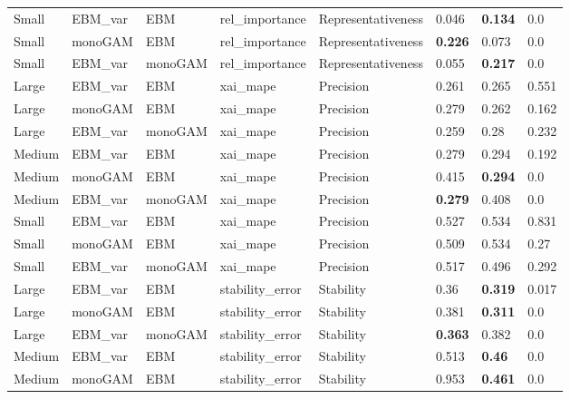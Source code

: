 \begin{table}[]
{\begin{tabular}{@{}llllllll@{}}
Small  & EBM\_var & EBM     & rel\_importance   & Representativeness & 0.046          & \textbf{0.134} & 0.0   \\
Small  & monoGAM        & EBM     & rel\_importance   & Representativeness & \textbf{0.226} & 0.073          & 0.0   \\
Small  & EBM\_var & monoGAM & rel\_importance   & Representativeness & 0.055          & \textbf{0.217} & 0.0   \\
Large  & EBM\_var & EBM     & xai\_mape         & Precision          & 0.261          & 0.265          & 0.551 \\
Large  & monoGAM        & EBM     & xai\_mape         & Precision          & 0.279          & 0.262          & 0.162 \\
Large  & EBM\_var & monoGAM & xai\_mape         & Precision          & 0.259          & 0.28           & 0.232 \\
Medium & EBM\_var & EBM     & xai\_mape         & Precision          & 0.279          & 0.294          & 0.192 \\
Medium & monoGAM        & EBM     & xai\_mape         & Precision          & 0.415          & \textbf{0.294} & 0.0   \\
Medium & EBM\_var & monoGAM & xai\_mape         & Precision          & \textbf{0.279} & 0.408          & 0.0   \\
Small  & EBM\_var & EBM     & xai\_mape         & Precision          & 0.527          & 0.534          & 0.831 \\
Small  & monoGAM        & EBM     & xai\_mape         & Precision          & 0.509          & 0.534          & 0.27  \\
Small  & EBM\_var & monoGAM & xai\_mape         & Precision          & 0.517          & 0.496          & 0.292 \\
Large  & EBM\_var & EBM     & stability\_error  & Stability          & 0.36           & \textbf{0.319} & 0.017 \\
Large  & monoGAM        & EBM     & stability\_error  & Stability          & 0.381          & \textbf{0.311} & 0.0   \\
Large  & EBM\_var & monoGAM & stability\_error  & Stability          & \textbf{0.363} & 0.382          & 0.0   \\
Medium & EBM\_var & EBM     & stability\_error  & Stability          & 0.513          & \textbf{0.46}  & 0.0   \\
Medium & monoGAM        & EBM     & stability\_error  & Stability          & 0.953          & \textbf{0.461} & 0.0   \\

\end{tabular}}
\end{table}
